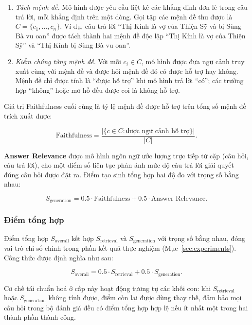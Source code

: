 \begin{enumerate}
  \item \textit{Tách mệnh đề.} Mô hình được yêu cầu liệt kê các khẳng định đơn lẻ trong câu trả lời, mỗi khẳng định trên một dòng. Gọi tập các mệnh đề thu được là $C = \{c_1, \ldots, c_n\}$. Ví dụ, câu trả lời ``Thị Kính là vợ của Thiện Sỹ và bị Sùng Bà vu oan'' được tách thành hai mệnh đề độc lập ``Thị Kính là vợ của Thiện Sỹ'' và ``Thị Kính bị Sùng Bà vu oan''.

  \item \textit{Kiểm chứng từng mệnh đề.} Với mỗi $c_i \in C$, mô hình được đưa ngữ cảnh truy xuất cùng với mệnh đề và được hỏi mệnh đề đó có được hỗ trợ hay không. Mệnh đề chỉ được tính là ``được hỗ trợ'' khi mô hình trả lời ``có''; các trường hợp ``không'' hoặc mơ hồ đều được coi là không hỗ trợ.
\end{enumerate}

Giá trị Faithfulness cuối cùng là tỷ lệ mệnh đề được hỗ trợ trên tổng số mệnh đề trích xuất được:

\begin{equation}
\text{Faithfulness} = \frac{|\{c \in C : \text{được ngữ cảnh hỗ trợ}\}|}{|C|}.
\end{equation}

\textbf{Answer Relevance} được mô hình ngôn ngữ ước lượng trực tiếp từ cặp (câu hỏi, câu trả lời), cho một điểm số liên tục phản ánh mức độ câu trả lời giải quyết đúng câu hỏi được đặt ra. Điểm tạo sinh tổng hợp hai độ đo với trọng số bằng nhau:

\begin{equation}
S_{\text{generation}} = 0.5 \cdot \text{Faithfulness} + 0.5 \cdot \text{Answer Relevance}.
\end{equation}

\subsubsection{Điểm tổng hợp}

Điểm tổng hợp $S_{\text{overall}}$ kết hợp $S_{\text{retrieval}}$ và $S_{\text{generation}}$ với trọng số bằng nhau, đóng vai trò chỉ số chính trong phần kết quả thực nghiệm (Mục~\ref{sec:experiments}). Công thức được định nghĩa như sau:

\begin{equation}
S_{\text{overall}} = 0.5 \cdot S_{\text{retrieval}} + 0.5 \cdot S_{\text{generation}}.
\end{equation}

Cơ chế tái chuẩn hoá ở cấp này hoạt động tương tự các khối con: khi $S_{\text{retrieval}}$ hoặc $S_{\text{generation}}$ không tính được, điểm còn lại được dùng thay thế, đảm bảo mọi câu hỏi trong bộ đánh giá đều có điểm tổng hợp hợp lệ nếu ít nhất một trong hai thành phần thành công.

